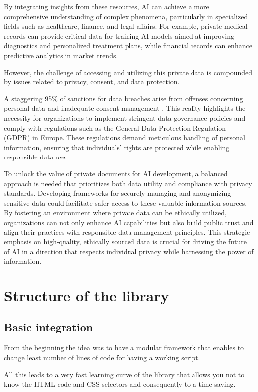 By integrating insights from these resources, AI can achieve a more comprehensive understanding of complex phenomena, particularly in specialized fields such as healthcare, finance, and legal affairs. For example, private medical records can provide critical data for training AI models aimed at improving diagnostics and personalized treatment plans, while financial records can enhance predictive analytics in market trends.

However, the challenge of accessing and utilizing this private data is compounded by issues related to privacy, consent, and data protection. 

A staggering 95\% of sanctions for data breaches arise from offenses concerning personal data and inadequate consent management \cite{privacyos2024}. This reality highlights the necessity for organizations to implement stringent data governance policies and comply with regulations such as the General Data Protection Regulation (GDPR) in Europe. These regulations demand meticulous handling of personal information, ensuring that individuals' rights are protected while enabling responsible data use.

To unlock the value of private documents for AI development, a balanced approach is needed that prioritizes both data utility and compliance with privacy standards. Developing frameworks for securely managing and anonymizing sensitive data could facilitate safer access to these valuable information sources. By fostering an environment where private data can be ethically utilized, organizations can not only enhance AI capabilities but also build public trust and align their practices with responsible data management principles. This strategic emphasis on high-quality, ethically sourced data is crucial for driving the future of AI in a direction that respects individual privacy while harnessing the power of information.
\newpage

\section{Structure of the library}
\subsection{Basic integration}

From the beginning the idea was to have a modular framework that enables to change least number of lines of code for having a working script. 

All this leads to a very fast learning curve of the library that allows you not to know the HTML code and CSS selectors and consequently to a time saving.

